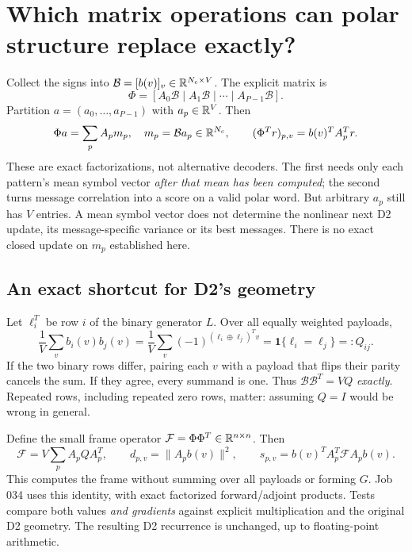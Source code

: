 \documentclass[10pt,a4paper]{article}
\begin{document}
\clearpage
\section{Which matrix operations can polar structure replace exactly?}
Collect the signs into $\mathcal B=[b(v)]_v\in\mathbb{R}^{N_c\times V}$. The explicit matrix is
\begin{equation}
 \Phi=[A_0\mathcal B\mid A_1\mathcal B\mid\cdots\mid A_{P-1}\mathcal B].
\end{equation}
Partition $a=(a_0,\ldots,a_{P-1})$ with $a_p\in\mathbb{R}^V$. Then
\begin{equation}
 \Phi a=\sum_p A_p m_p,\quad m_p=\mathcal B a_p\in\mathbb{R}^{N_c},\qquad
 (\Phi^T r)_{p,v}=b(v)^T A_p^T r.
 \label{eq:factor}
\end{equation}
These are exact factorizations, not alternative decoders. The first needs only each pattern's mean symbol vector
\emph{after that mean has been computed}; the second turns message correlation into a score on a valid polar word.
But arbitrary $a_p$ still has $V$ entries. A mean symbol vector does not determine the nonlinear next D2 update,
its message-specific variance or its best messages. There is no exact closed update on $m_p$ established here.

\subsection{An exact shortcut for D2's geometry}
Let $\ell_i^T$ be row $i$ of the binary generator $L$. Over all equally weighted payloads,
\begin{equation}
 \frac1V\sum_v b_i(v)b_j(v)
 =\frac1V\sum_v(-1)^{(\ell_i\oplus\ell_j)^T v}
 =\mathbf 1\{\ell_i=\ell_j\}=:Q_{ij}.
 \label{eq:character}
\end{equation}
If the two binary rows differ, pairing each $v$ with a payload that flips their parity cancels the sum.
If they agree, every summand is one. Thus $\mathcal B\mathcal B^T=VQ$ \emph{exactly}.
Repeated rows, including repeated zero rows, matter: assuming $Q=I$ would be wrong in general.

Define the small frame operator $\mathcal F=\Phi\Phi^T\in\mathbb{R}^{n\times n}$. Then
\begin{equation}
 \boxed{\mathcal F=V\sum_p A_p Q A_p^T},\qquad
 d_{p,v}=\|A_p b(v)\|^2,\qquad
 s_{p,v}=b(v)^T A_p^T\mathcal F A_p b(v).
 \label{eq:frame}
\end{equation}
This computes the frame without summing over all payloads or forming $G$. Job 034 uses this identity, with exact
factorized forward/adjoint products. Tests compare both values \emph{and gradients} against explicit multiplication
and the original D2 geometry. The resulting D2 recurrence is unchanged, up to floating-point arithmetic.
\end{document}
